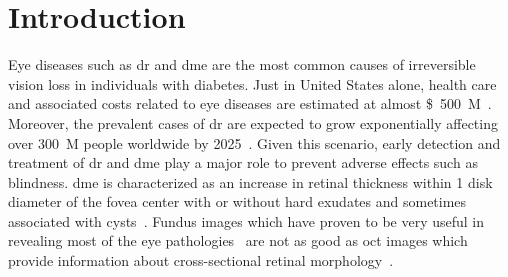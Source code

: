 
\graphicspath{ {./content/intro/figures/} }

\section{Introduction}

Eye diseases such as \ac{dr} and \ac{dme} are the most common causes of irreversible vision loss in individuals with diabetes.
Just in United States alone, health care and associated costs related to eye diseases are estimated at almost \SI{500}[\$]{M}~\cite{Sharma2005}.
Moreover, the prevalent cases of \ac{dr} are expected to grow exponentially affecting over \SI{300}{M} people worldwide by 2025~\cite{Wild2004}.
Given this scenario, early detection and treatment of \ac{dr} and \ac{dme} play a major role to prevent adverse effects such as blindness.
\ac{dme} is characterized as an increase in retinal thickness within 1 disk diameter of the fovea center with or without hard exudates and sometimes associated with cysts~\cite{ETDRSG1985}.
Fundus images which have proven to be very useful in revealing most of the eye pathologies~\cite{Mookiah20132136,Trucco2013} are not as good as \ac{oct} images which provide information about cross-sectional retinal morphology~\cite{Wang2015}.  

